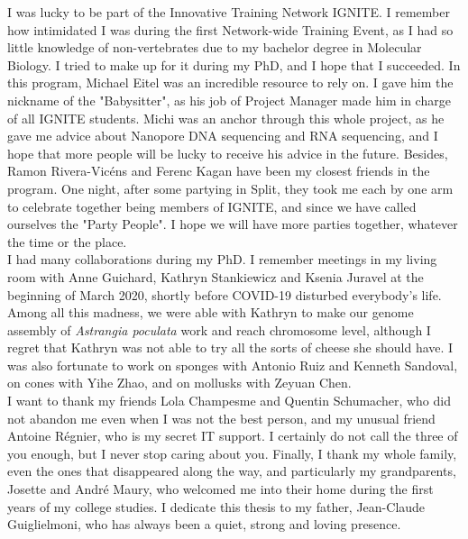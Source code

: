 I was lucky to be part of the Innovative Training Network IGNITE. I remember how intimidated I was during the first Network-wide Training Event, as I had so little knowledge of non-vertebrates due to my bachelor degree in Molecular Biology. I tried to make up for it during my PhD, and I hope that I succeeded. In this program, Michael Eitel was an incredible resource to rely on. I gave him the nickname of the "Babysitter", as his job of Project Manager made him in charge of all IGNITE students. Michi was an anchor through this whole project, as he gave me advice about Nanopore DNA sequencing and RNA sequencing, and I hope that more people will be lucky to receive his advice in the future. Besides, Ramon Rivera-Vicéns and Ferenc Kagan have been my closest friends in the program. One night, after some partying in Split, they took me each by one arm to celebrate together being members of IGNITE, and since we have called ourselves the "Party People". I hope we will have more parties together, whatever the time or the place. \\

I had many collaborations during my PhD. I remember meetings in my living room with Anne Guichard, Kathryn Stankiewicz and Ksenia Juravel at the beginning of March 2020, shortly before COVID-19 disturbed everybody's life. Among all this madness, we were able with Kathryn to make our genome assembly of \textit{Astrangia poculata} work and reach chromosome level, although I regret that Kathryn was not able to try all the sorts of cheese she should have. I was also fortunate to work on sponges with Antonio Ruiz and Kenneth Sandoval, on cones with Yihe Zhao, and on mollusks with Zeyuan Chen. \\

I want to thank my friends Lola Champesme and Quentin Schumacher, who did not abandon me even when I was not the best person, and my unusual friend Antoine Régnier, who is my secret IT support. I certainly do not call the three of you enough, but I never stop caring about you. Finally, I thank my whole family, even the ones that disappeared along the way, and particularly my grandparents, Josette and André Maury, who welcomed me into their home during the first years of my college studies. I dedicate this thesis to my father, Jean-Claude Guiglielmoni, who has always been a quiet, strong and loving presence. \\